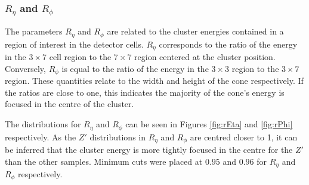 \documentclass{article}
\begin{document}
\subsubsection{$R_{\eta}$ and $R_{\phi}$}

The parameters $R_{\eta}$ and $R_{\phi}$ are related to the cluster energies contained in a region of interest in the detector cells. $R_{\eta}$ corresponds to the ratio of the energy in the $3\times7$ cell region to the $7\times7$ region centered at the cluster position. Conversely, $R_{\phi}$ is equal to the ratio of the energy in the $3\times3$ region to the $3\times7$ region. These quantities relate to the width and height of the cone respectively. If the ratios are close to one, this indicates the majority of the cone's energy is focused in the centre of the cluster.

The distributions for $R_{\eta}$ and $R_{\phi}$ can be seen in Figures \ref{fig:rEta} and \ref{fig:rPhi} respectively. As the $Z'$ distributions in $R_{\eta}$ and $R_{\phi}$ are centred closer to 1, it can be inferred that the cluster energy is more tightly focused in the centre for the $Z'$ than the other samples. Minimum cuts were placed at $0.95$ and $0.96$ for $R_{\eta}$ and $R_{\phi}$ respectively.
\end{document}
